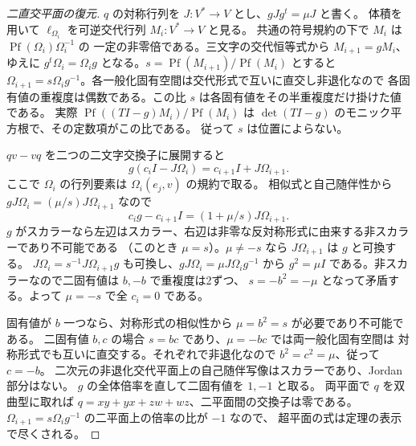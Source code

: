 \begin{proof}[二直交平面の復元]
$q$ の対称行列を $J:V^*\to V$ とし、$gJg^t=\mu J$ と書く。
体積を用いて $\ell_{\Omega_i}$ を可逆交代行列 $M_i:V^*\to V$ と見る。
共通の符号規約の下で $M_i$ は $\operatorname{Pf}(\Omega_i)\Omega_i^{-1}$ の
一定の非零倍である。三文字の交代恒等式から $M_{i+1}=g M_i$、
ゆえに $g^t\Omega_i=\Omega_i g$ となる。$s=\operatorname{Pf}(M_{i+1})/\operatorname{Pf}(M_i)$ とすると
$\Omega_{i+1}=s\Omega_i g^{-1}$。各一般化固有空間は交代形式で互いに直交し非退化なので
各固有値の重複度は偶数である。この比 $s$ は各固有値をその半重複度だけ掛けた値である。
実際 $\operatorname{Pf}((T I-g)M_i)/\operatorname{Pf}(M_i)$ は
$\det(T I-g)$ のモニック平方根で、その定数項がこの比である。
従って $s$ は位置によらない。

$qv-vq$ を二つの二文字交換子に展開すると
\[
 g(c_i I-J\Omega_i)=c_{i+1} I+J\Omega_{i+1}.
\]
ここで $\Omega_i$ の行列要素は $\Omega_i(e_j,v)$ の規約で取る。
相似式と自己随伴性から $gJ\Omega_i=(\mu/s)J\Omega_{i+1}$ なので
\[
 c_i g-c_{i+1} I=(1+\mu/s)J\Omega_{i+1}.
\]
$g$ がスカラーなら左辺はスカラー、右辺は非零な反対称形式に由来する非スカラーであり不可能である
（このとき $\mu=s$）。$\mu\ne -s$ なら $J\Omega_{i+1}$ は $g$ と可換する。
$J\Omega_i=s^{-1}J\Omega_{i+1}g$ も可換し、$gJ\Omega_i=\mu J\Omega_i g^{-1}$ から
$g^2=\mu I$ である。非スカラーなので二固有値は $b,-b$ で重複度は2ずつ、
$s=-b^2=-\mu$ となって矛盾する。よって $\mu=-s$ で全 $c_i=0$ である。

固有値が $b$ 一つなら、対称形式の相似性から $\mu=b^2=s$ が必要であり不可能である。
二固有値 $b,c$ の場合 $s=bc$ であり、$\mu=-bc$ では両一般化固有空間は
対称形式でも互いに直交する。それぞれで非退化なので $b^2=c^2=\mu$、従って $c=-b$。
二次元の非退化交代平面上の自己随伴写像はスカラーであり、Jordan部分はない。
$g$ の全体倍率を直して二固有値を $1,-1$ と取る。
両平面で $q$ を双曲型に取れば $q=xy+yx+zw+wz$、二平面間の交換子は零である。
$\Omega_{i+1}=s\Omega_i g^{-1}$ の二平面上の倍率の比が $-1$ なので、
超平面の式は定理の表示で尽くされる。
\end{proof}

